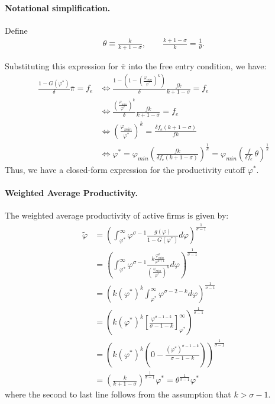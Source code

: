 \begin{solution}
    \paragraph{Notational simplification.} Define
    \begin{align*}
        \theta \equiv \frac{k}{k + 1 - \sigma}, \qquad \frac{k + 1 - \sigma}{k} = \frac{1}{\theta}.
    \end{align*}

    Substituting this expression for $\bar{\pi}$ into the free entry condition, we have:
    \begin{align*}
        \frac{1-G(\varphi^*)}{\delta} \bar{\pi} = f_e &\iff \frac{1 - (1-(\frac{\varphi_{min}}{\varphi^*})^k)}{\delta} \frac{fk}{k + 1 - \sigma} = f_e \\
        &\iff \frac{(\frac{\varphi_{min}}{\varphi^*})^k}{\delta} \frac{fk}{k + 1 - \sigma} = f_e \\
        &\iff \left(\frac{\varphi_{min}}{\varphi^*}\right)^k = \frac{\delta f_e (k + 1 - \sigma)}{fk} \\
        &\iff \varphi^* = \varphi_{min} \left(\frac{fk}{\delta f_e (k + 1 - \sigma)}\right)^{\frac{1}{k}} = \varphi_{min} \left( \frac{f}{\delta f_e}\, \theta \right)^{\frac{1}{k}}
    \end{align*}
    Thus, we have a closed-form expression for the productivity cutoff $\varphi^*$. 

    \paragraph{Weighted Average Productivity.} The weighted average productivity of active firms is given by:
    \begin{align*}
        \tilde{\varphi} &= \left( \int_{\varphi^*}^{\infty} \varphi^{\sigma - 1} \frac{g(\varphi)}{1 - G(\varphi^*)} d\varphi \right)^{\frac{1}{\sigma - 1}} \\
        &= \left( \int_{\varphi^*}^{\infty} \varphi^{\sigma - 1} \frac{k \frac{\varphi_{min}^k}{\varphi^{k+1}}}{\left( \frac{\varphi_{min}}{\varphi^*} \right)^k} d\varphi \right)^{\frac{1}{\sigma - 1}} \\
        &= \left( k \left(\varphi^*\right)^k \int_{\varphi^*}^{\infty} \varphi^{\sigma - 2 - k} d\varphi \right)^{\frac{1}{\sigma - 1}} \\
        &= \left( k \left(\varphi^*\right)^k \left[ \frac{\varphi^{\sigma - 1 - k}}{\sigma - 1 - k} \right]_{\varphi^*}^{\infty} \right)^{\frac{1}{\sigma - 1}} \\
        &= \left( k \left(\varphi^*\right)^k \left( 0 - \frac{(\varphi^*)^{\sigma - 1 - k}}{\sigma - 1 - k} \right) \right)^{\frac{1}{\sigma - 1}} \\
        &= \left( \frac{k}{k + 1 - \sigma} \right)^{\frac{1}{\sigma - 1}} \varphi^* = \theta^{\frac{1}{\sigma - 1}} \varphi^* 
    \end{align*}
    where the second to last line follows from the assumption that $k > \sigma - 1$.


\end{solution}

